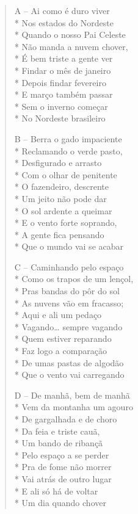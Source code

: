 \begin{verse}
A -- Ai como é duro viver\\*
Nos estados do Nordeste\\*
Quando o nosso Pai Celeste\\*
Não manda a nuvem chover,\\*
É bem triste a gente ver\\*
Findar o mês de janeiro\\*
Depois findar fevereiro\\*
E março também passar\\*
Sem o inverno começar\\*
No Nordeste brasileiro

B -- Berra o gado impaciente\\*
Reclamando o verde pasto,\\*
Desfigurado e arrasto\\*
Com o olhar de penitente\\*
O fazendeiro, descrente\\*
Um jeito não pode dar\\*
O sol ardente a queimar\\*
E o vento forte soprando,\\*
A gente fica pensando\\*
Que o mundo vai se acabar

C -- Caminhando pelo espaço\\*
Como os trapos de um lençol,\\*
Pras bandas do pôr do sol\\*
As nuvens vão em fracasso;\\*
Aqui e ali um pedaço\\*
Vagando\ldots{} sempre vagando\\*
Quem estiver reparando\\*
Faz logo a comparação\\*
De umas pastas de algodão\\*
Que o vento vai carregando

D -- De manhã, bem de manhã\\*
Vem da montanha um agouro\\*
De gargalhada e de choro\\*
Da feia e triste cauã,\\*
Um bando de ribançã\\*
Pelo espaço a se perder\\*
Pra de fome não morrer\\*
Vai atrás de outro lugar\\*
E ali só há de voltar\\*
Um dia quando chover


\end{verse}
